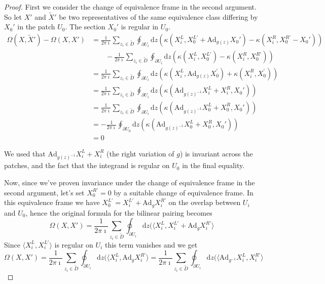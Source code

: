 \documentclass[11pt, oneside, reqno]{amsart}
\theoremstyle{definition} \newtheorem{definition}{Definition}[section]
\theoremstyle{definition} \newtheorem{remark}[definition]{Remark}
\theoremstyle{definition} \newtheorem{remarks}[definition]{Remarks}
\theoremstyle{definition} \newtheorem{question}[definition]{Question}
\theoremstyle{definition} \newtheorem*{note}{Note}
\theoremstyle{definition} \newtheorem{example}[definition]{Example}
\theoremstyle{definition} \newtheorem{examples}[definition]{Examples}
\newcommand{\mr}[1]{\mathrm{#1}}
\renewcommand{\d}{\mathrm{d}}
\newcommand{\Ad}{\mr{Ad}}
\begin{document}
\begin{proof}
First we consider the change of equivalence frame in the second argument.  So let $X'$ and $\tilde X'$ be two representatives of the same equivalence class differing by $X_0'$ in the patch $U_0$. The section $X_{0}'$ is regular in $U_{0}$. 
\begin{align*}
   \Omega(X, \tilde X') - \Omega( X,X')  &= \frac{1}{2 \pi \imath} \sum_{z_i \in \tilde D} \oint_{\partial U_i}  \d z (
   \kappa(  X^{L}_{i} ,  X^{L'}_{0} + \Ad_{g(z)} X_{0}' )  - \kappa( X^{R}_{i} ,  X^{R'}_{0} - X_{0}') ) \\
   &\qquad - \frac{1}{2 \pi \imath} \sum_{z_i \in \tilde D} \oint_{\partial U_i}  \d z (
   \kappa(  X^{L}_{i} ,  X^{L'}_{0} )  - \kappa( X^{R}_{i} ,  X^{R'}_{0} ) ) \\  
   &= \frac{1}{2 \pi \imath} \sum_{z_i \in \tilde D} \oint_{\partial U_i}  \d z (
\kappa(   X_{i}^{L},   \Ad_{g(z)}X^{'}_{0} )  + \kappa(  X_{i}^{R},  X^{'}_{0} ) ) \\ 
&= \frac{1}{2 \pi \imath} \sum_{z_i \in \tilde D} \oint_{\partial U_i}  \d z (\kappa(   \Ad_{g(z)^{-1}}  X_{i}^{L} + X_{i}^{R}, X_{0}' ) ) \\ 
&= \frac{1}{2 \pi \imath} \sum_{z_i \in \tilde D} \oint_{\partial U_i}  \d z (\kappa(   \Ad_{g(z)^{-1}}  X_{0}^{L} + X_{0}^{R}, X_{0}' ) ) \\ 
&= - \frac{1}{2 \pi \imath} \oint_{\partial U_0} \d z (\kappa(   \Ad_{g(z)^{-1}}  X_{0}^{L} + X_{0}^{R}, X_{0}' ) ) \\ 
&= 0 
\end{align*}

We used that $\Ad_{g(z)^{-1}}  X_{i}^{L} + X_{i}^{R}$ (the right variation of $g$) is invariant across the patches, and the fact that the integrand is regular on $U_0$ in the final equality.

Now, since we've proven invariance under the change of equivalence frame in the second argument, let's set $X_{0}^{R'} = 0$ by a suitable change of equivalence frame.  In this equivalence frame we have $X_{0}^{L'} = X_i^{L'} + \Ad_{g} X_i^{R'}$
on the overlap between $U_i$ and $U_0$, hence the original formula for the bilinear pairing becomes 
\[
\Omega(X, X') =   \frac{1}{2 \pi \imath} \sum_{z_i \in \tilde D} \oint_{\partial U_i}  \d z (
\langle  X^{L}_{i}, X_i^{L'} + \Ad_{g} X_i^{R'} \rangle 
\]
Since $\langle X_i^{L}, X_{i}^{L'} \rangle $ is regular on $U_i$ this term vanishes and we get
\begin{equation}
\label{eq:drop-right}
  \Omega(X, X') =   \frac{1}{2 \pi \imath} \sum_{z_i \in \tilde D} \oint_{\partial U_i}  \d z (
\langle  X^{L}_{i},  \Ad_{g} X_i^{R'} \rangle  =  \frac{1}{2 \pi \imath} \sum_{z_i \in \tilde D} \oint_{\partial U_i}  \d z (
\langle  \Ad_{g^{-1}} X^{L}_{i},   X_i^{R'} \rangle 
\end{equation}


\end{proof}
\end{document}
